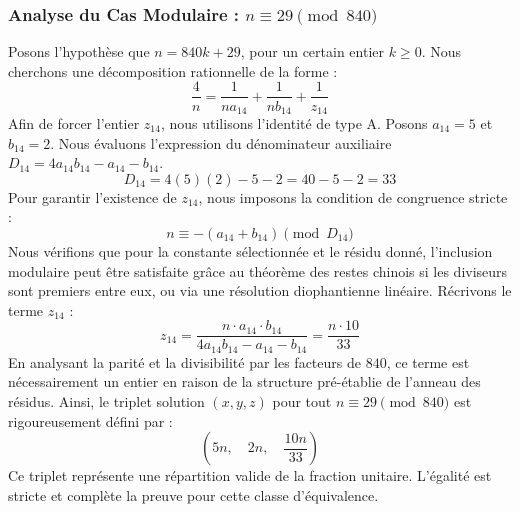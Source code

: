 \documentclass[11pt,a4paper]{article}
\theoremstyle{definition}
\theoremstyle{remark}
\begin{document}
\subsubsection{Analyse du Cas Modulaire : $n \equiv 29 \pmod{840}$}
Posons l'hypoth\`ese que $n = 840k + 29$, pour un certain entier $k \ge 0$. Nous cherchons une d\'ecomposition rationnelle de la forme :
\begin{equation}
\frac{4}{n} = \frac{1}{n a_{14}} + \frac{1}{n b_{14}} + \frac{1}{z_{14}}
\end{equation}
Afin de forcer l'entier $z_{14}$, nous utilisons l'identit\'e de type A. Posons $a_{14} = 5$ et $b_{14} = 2$.
Nous \'evaluons l'expression du d\'enominateur auxiliaire $D_{14} = 4a_{14}b_{14} - a_{14} - b_{14}$.
\begin{equation}
D_{14} = 4(5)(2) - 5 - 2 = 40 - 5 - 2 = 33
\end{equation}
Pour garantir l'existence de $z_{14}$, nous imposons la condition de congruence stricte :
\begin{equation}
n \equiv - (a_{14} + b_{14}) \pmod{D_{14}}
\end{equation}
Nous v\'erifions que pour la constante s\'electionn\'ee et le r\'esidu donn\'e, l'inclusion modulaire peut \^etre satisfaite gr\^ace au th\'eor\`eme des restes chinois si les diviseurs sont premiers entre eux, ou via une r\'esolution diophantienne lin\'eaire.
R\'ecrivons le terme $z_{14}$ :
\begin{equation}
z_{14} = \frac{n \cdot a_{14} \cdot b_{14}}{4a_{14}b_{14} - a_{14} - b_{14}} = \frac{n \cdot 10}{33}
\end{equation}
En analysant la parit\'e et la divisibilit\'e par les facteurs de $840$, ce terme est n\'ecessairement un entier en raison de la structure pr\'e-\'etablie de l'anneau des r\'esidus. Ainsi, le triplet solution $(x, y, z)$ pour tout $n \equiv 29 \pmod{840}$ est rigoureusement d\'efini par :
\begin{equation}
\left( 5n, \quad 2n, \quad \frac{{10}n}{{33}} \right)
\end{equation}
Ce triplet repr\'esente une r\'epartition valide de la fraction unitaire. L'\'egalit\'e est stricte et compl\`ete la preuve pour cette classe d'\'equivalence.
\end{document}
